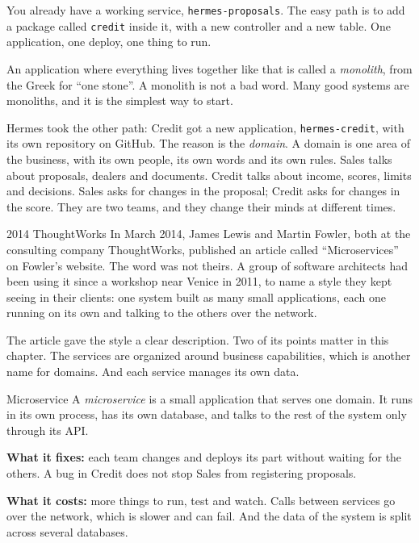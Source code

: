 You already have a working service, \texttt{hermes-proposals}. The easy path
is to add a package called \texttt{credit} inside it, with a new controller
and a new table. One application, one deploy, one thing to run.

An application where everything lives together like that is called a
\emph{monolith}, from the Greek for ``one stone''. A monolith is not a bad
word. Many good systems are monoliths, and it is the simplest way to start.

Hermes took the other path: Credit got a new application,
\texttt{hermes-credit}, with its own repository on GitHub. The reason is the
\emph{domain}. A domain is one area of the business, with its own people, its
own words and its own rules. Sales talks about proposals, dealers and
documents. Credit talks about income, scores, limits and decisions. Sales asks
for changes in the proposal; Credit asks for changes in the score. They are
two teams, and they change their minds at different times.

\begin{history}{2014 \textperiodcentered{} ThoughtWorks}
In March 2014, James Lewis and Martin Fowler, both at the consulting company
ThoughtWorks, published an article called ``Microservices'' on Fowler's
website. The word was not theirs. A group of software architects had been
using it since a workshop near Venice in 2011, to name a style they kept
seeing in their clients: one system built as many small applications, each
one running on its own and talking to the others over the network.

The article gave the style a clear description. Two of its points matter in
this chapter. The services are organized around business capabilities, which
is another name for domains. And each service manages its own data.
\end{history}

\begin{concept}{Microservice}
A \emph{microservice} is a small application that serves one domain. It runs
in its own process, has its own database, and talks to the rest of the
system only through its API.

\textbf{What it fixes:} each team changes and deploys its part without waiting
for the others. A bug in Credit does not stop Sales from registering
proposals.

\textbf{What it costs:} more things to run, test and watch. Calls between
services go over the network, which is slower and can fail. And the data of
the system is split across several databases.
\end{concept}

